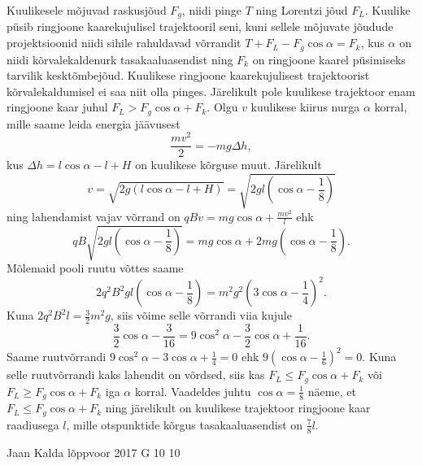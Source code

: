 \documentclass[11pt]{article}
\begin{document}
{{\ifSolution
Kuulikesele mõjuvad raskusjõud $F_g$, niidi pinge $T$ ning Lorentzi jõud $F_L$. Kuulike püsib ringjoone kaarekujulisel trajektooril seni, kuni sellele mõjuvate jõudude projektsioonid niidi sihile rahuldavad võrrandit $T+F_L-F_g\cos\alpha=F_k$, kus $\alpha$ on niidi kõrvalekaldenurk tasakaaluasendist ning $F_k$ on ringjoone kaarel püsimiseks tarvilik kesktõmbejõud. Kuulikese ringjoone kaarekujulisest trajektoorist kõrvalekaldumisel ei saa niit olla pinges. Järelikult pole kuulikese trajektoor enam ringjoone kaar juhul $F_L>F_g\cos\alpha+F_k$. Olgu $v$ kuulikese kiirus nurga $\alpha$ korral, mille saame leida energia jäävusest 
\[
\frac{mv^2}{2}=-mg\Delta h,
\]
kus $\Delta h=l\cos\alpha-l+H$ on kuulikese kõrguse muut. Järelikult 
\[
v=\sqrt{2g\left(l\cos\alpha-l+H\right)}=\sqrt{2gl\left(\cos\alpha-\frac{1}{8}\right)}
\]
ning lahendamist vajav võrrand on $qBv=mg\cos\alpha+\frac{mv^2}{l}$ ehk 
\[
qB\sqrt{2gl\left(\cos\alpha-\frac{1}{8}\right)}=mg\cos\alpha+2mg\left(\cos\alpha-\frac{1}{8}\right).
\]
Mõlemaid pooli ruutu võttes saame
\[
2q^2B^2gl\left(\cos\alpha-\frac{1}{8}\right)=m^2g^2\left(3\cos\alpha-\frac{1}{4}\right)^2.
\] 
Kuna $2q^2B^2l=\frac{3}{2}m^2g$, siis võime selle võrrandi viia kujule 
\[
\frac{3}{2}\cos\alpha-\frac{3}{16}=9\cos^2\alpha-\frac{3}{2}\cos\alpha+\frac{1}{16}.
\]
Saame ruutvõrrandi $9\cos^2\alpha-3\cos\alpha+\frac{1}{4}=0$ ehk $9\left(\cos\alpha-\frac{1}{6}\right)^2=0$. Kuna selle ruutvõrrandi kaks lahendit on võrdsed, siis kas $F_L\leq F_g\cos\alpha+F_k$ või $F_L\geq F_g\cos\alpha+F_k$ iga $\alpha$ korral. Vaadeldes juhtu $\cos\alpha=\frac{1}{8}$ näeme, et $F_L\leq F_g\cos\alpha+F_k$ ning järelikult on kuulikese trajektoor ringjoone kaar raadiusega $l$, mille otspunktide kõrgus tasakaaluasendist on $\frac{7}{8}l$.
\fi
}

{Jaan Kalda} %
{lõppvoor} %
{2017} %
{G 10} %
{10} %
{

}}
\end{document}
